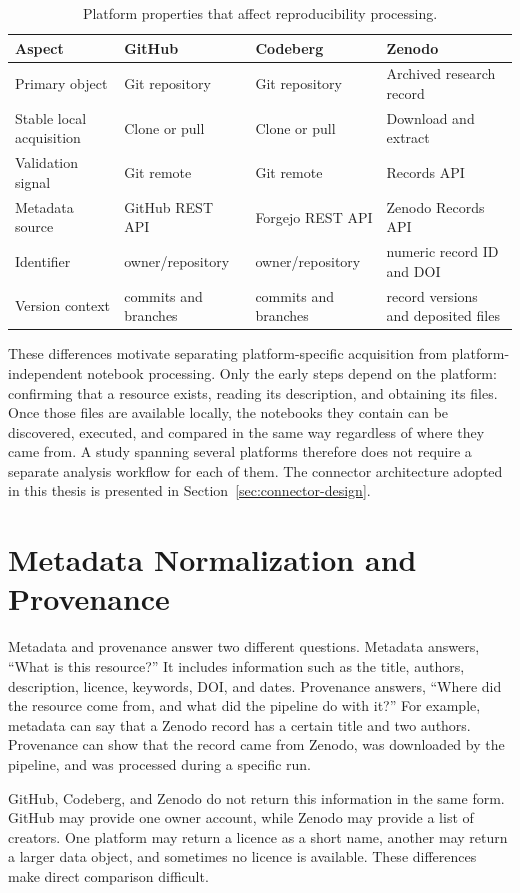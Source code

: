 \begin{table}[ht]
\centering
\caption{Platform properties that affect reproducibility processing.}
\label{tab:platform-differences}
\small
\begin{tabularx}{\textwidth}{@{}lXXX@{}}
\toprule
Aspect & GitHub & Codeberg & Zenodo\tabularnewline
\midrule
Primary object & Git repository & Git repository & Archived research record\tabularnewline
Stable local acquisition & Clone or pull & Clone or pull & Download and extract\tabularnewline
Validation signal & Git remote & Git remote & Records API\tabularnewline
Metadata source & GitHub REST API & Forgejo REST API & Zenodo Records API\tabularnewline
Identifier & owner/repository & owner/repository & numeric record ID and DOI\tabularnewline
Version context & commits and branches & commits and branches & record versions and deposited files\tabularnewline
\bottomrule
\end{tabularx}
\end{table}

These differences motivate separating platform-specific acquisition from platform-independent notebook processing. Only the early steps depend on the platform: confirming that a resource exists, reading its description, and obtaining its files. Once those files are available locally, the notebooks they contain can be discovered, executed, and compared in the same way regardless of where they came from. A study spanning several platforms therefore does not require a separate analysis workflow for each of them. The connector architecture adopted in this thesis is presented in Section~\ref{sec:connector-design}.

\section{Metadata Normalization and Provenance}

Metadata and provenance answer two different questions. Metadata answers, ``What is this resource?'' It includes information such as the title, authors, description, licence, keywords, DOI, and dates. Provenance answers, ``Where did the resource come from, and what did the pipeline do with it?'' For example, metadata can say that a Zenodo record has a certain title and two authors. Provenance can show that the record came from Zenodo, was downloaded by the pipeline, and was processed during a specific run.

GitHub, Codeberg, and Zenodo do not return this information in the same form. GitHub may provide one owner account, while Zenodo may provide a list of creators. One platform may return a licence as a short name, another may return a larger data object, and sometimes no licence is available. These differences make direct comparison difficult.

